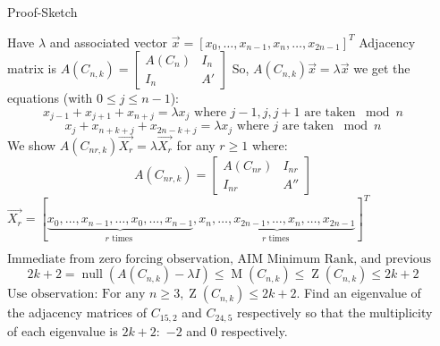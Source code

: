 \documentclass[final]{beamer}
\newcommand{\M}{\operatorname{M}}
\newcommand{\Z}{\operatorname{Z}}
\newcommand{\nul}{\operatorname{null}}
\newcommand{\eit}{\end{itemize}}
\begin{document}
\begin{frame}{}
\begin{columns}[t]
\begin{column}{0.48\linewidth}

        \begin{block}{Proof-Sketch}
        
Have $\lambda$ and associated vector $\vec{x}=[x_0, \ldots, x_{n-1}, x_{n}, \ldots, x_{2n-1}]^T$
Adjacency matrix is $A(C_{n,k}) = \begin{bmatrix} A(C_{n}) & I_{n}\\
I_{n} & A' \end{bmatrix}$
So, $A(C_{n,k})\vec{x} = \lambda \vec{x}$ we get the equations (with $0 \leq j \leq n-1$):
$$x_{j-1} + x_{j+1} + x_{n+j} = \lambda x_j \text{ where }j-1,j,j+1 \text{ are taken }\bmod n$$
$$x_{j} + x_{n+k+j} + x_{2n-k+j} = \lambda x_j \text{ where }j \text{ are taken }\bmod n$$
We show $A(C_{nr,k}) \vec{X_r} = \lambda \vec{X_r}$ for any $r \geq 1$ where:
$$A(C_{nr,k}) = \begin{bmatrix} A(C_{nr}) & I_{nr}\\
I_{nr} & A'' \end{bmatrix}$$
$\vec{X_r} = [\underbrace{x_0, \ldots, x_{n-1}, \ldots, x_0, \ldots, x_{n-1}}_{r \text{ times }}, \underbrace{x_{n}, \ldots, x_{2n-1}, \ldots, x_{n}, \ldots, x_{2n-1}}_{r \text{ times }}]^T$

$$\text{Immediate from zero forcing observation, AIM Minimum Rank, and previous lemma}$$
\[
2k+2 = \nul(A(C_{n,k}) - \lambda I) \leq \M(C_{n,k}) \leq \Z(C_{n,k}) \leq 2k+2
\]
$\text{Use observation:  For any }n \geq 3, \Z(C_{n,k}) \leq 2k + 2$.
Find an eigenvalue of the adjacency matrices of $C_{15,2}$ and $C_{24,5}$ respectively so that the multiplicity of  each eigenvalue is $2k+2:$ $-2$ and $0$ respectively.
       \end{block}




      

    \end{column}%
    
    

    \begin{column}{0.235 \linewidth}


\end{column}
\end{columns}
\end{frame}
\end{document}
